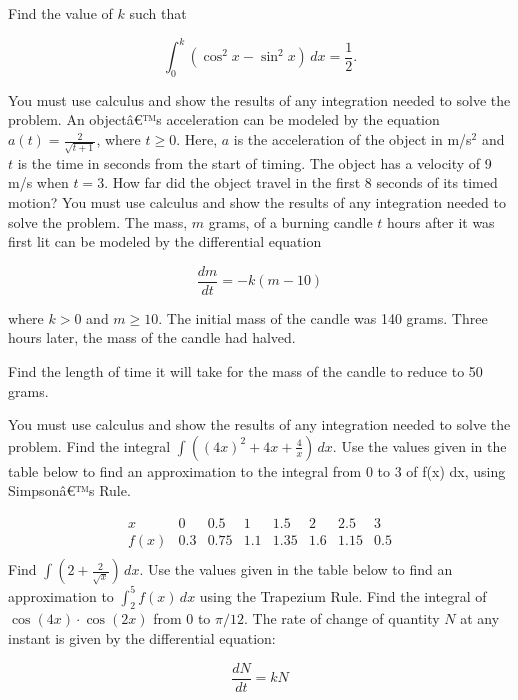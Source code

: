 \documentclass[12pt,addpoints]{exam}
\begin{document}
\begin{questions}
Find the value of \( k \) such that

\[
\int_{0}^{k} (\cos^2 x - \sin^2 x) \, dx = \frac{1}{2}.
\]

You must use calculus and show the results of any integration needed to solve the problem.
\fillwithlines{3cm}
\question[5] An objectâ€™s acceleration can be modeled by the equation \( a(t) = \frac{2}{\sqrt{t+1}} \), where \( t \geq 0 \). Here, \( a \) is the acceleration of the object in m/s\(^2\) and \( t \) is the time in seconds from the start of timing. The object has a velocity of 9 m/s when \( t = 3 \). How far did the object travel in the first 8 seconds of its timed motion? You must use calculus and show the results of any integration needed to solve the problem.
\fillwithlines{3cm}
\question[5] The mass, \( m \) grams, of a burning candle \( t \) hours after it was first lit can be modeled by the differential equation

\[ \frac{dm}{dt} = -k(m - 10) \]

where \( k > 0 \) and \( m \geq 10 \). The initial mass of the candle was 140 grams. Three hours later, the mass of the candle had halved.

Find the length of time it will take for the mass of the candle to reduce to 50 grams.

You must use calculus and show the results of any integration needed to solve the problem.
\fillwithlines{3cm}
\question[5] Find the integral \(\int \left( (4x)^2 + 4x + \frac{4}{x} \right) \, dx\).
\fillwithlines{3cm}
\question[5] Use the values given in the table below to find an approximation to the integral from 0 to 3 of f(x) dx, using Simpsonâ€™s Rule.

\[
\begin{array}{c|ccccccc}
x & 0 & 0.5 & 1 & 1.5 & 2 & 2.5 & 3 \\
\hline
f(x) & 0.3 & 0.75 & 1.1 & 1.35 & 1.6 & 1.15 & 0.5 \\
\end{array}
\]
\fillwithlines{3cm}
\question[5] Find \(\int \left( 2 + \frac{2}{\sqrt{x}} \right) \, dx\).
\fillwithlines{3cm}
\question[5] Use the values given in the table below to find an approximation to \(\int_{2}^{5} f(x) \, dx\) using the Trapezium Rule.
\fillwithlines{3cm}
\question[5] Find the integral of \(\cos(4x) \cdot \cos(2x)\) from 0 to \(\pi/12\).
\fillwithlines{3cm}
\question[5] The rate of change of quantity \( N \) at any instant is given by the differential equation:

\[
\frac{dN}{dt} = kN
\]


\end{questions}
\end{document}

